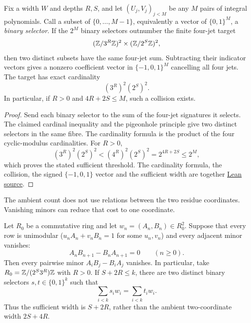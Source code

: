 \documentclass[11pt]{article}
\begin{document}
\begin{theorem}\label{res:jetkernel}
Fix a width \(W\) and depths \(R,S\), and let \((U_j,V_j)_{j<M}\) be any \(M\)
pairs of integral polynomials.  Call a subset of \(\{0,\dots,M-1\}\), equivalently
a vector of \(\{0,1\}^M\), a \emph{binary selector}.  If the
\(2^M\) binary selectors outnumber the finite four-jet target
\[
 (\mathbb{Z}/3^R\mathbb{Z})^2\times(\mathbb{Z}/2^S\mathbb{Z})^2,
\]
then two distinct subsets have the same four-jet sum.  Subtracting their
indicator vectors gives a nonzero coefficient vector in
\(\{-1,0,1\}^M\) cancelling all four jets.  The target has exact cardinality
\[
 (3^R)^2(2^S)^2.
\]
In particular, if \(R>0\) and \(4R+2S\le M\), such a collision exists.
\end{theorem}

\begin{proof}
Send each binary selector to the sum of the four-jet signatures it selects.
The claimed cardinal inequality and the pigeonhole principle give two
distinct selectors in the same fibre.  The cardinality formula is the product
of the four cyclic-modulus cardinalities.  For \(R>0\),
\[
 (3^R)^2(2^S)^2<(4^R)^2(2^S)^2=2^{4R+2S}\le2^M,
\]
which proves the stated sufficient threshold.
The cardinality formula, the collision, the signed \(\{-1,0,1\}\) vector and
the sufficient width are together \href{https://github.com/wcook04/plectis-erdos/blob/f36a98bf3d3e6f65f1074e3b800e3293d5b8a51a/ErdosProblems/Erdos1049/PaperFiniteAssembliesR7.lean#L248}{Lean source}.
\end{proof}

The ambient count does not use relations between the two residue
coordinates.  Vanishing minors can reduce that cost to one coordinate.

\begin{theorem}
\label{res:plucker-collapse}
Let $R_0$ be a commutative ring and let $w_n=(A_n,B_n)\in R_0^2$.  Suppose
that every row is unimodular ($u_n A_n+v_n B_n=1$ for some $u_n,v_n$) and every adjacent minor vanishes:
\[
 A_nB_{n+1}-B_nA_{n+1}=0\qquad(n\ge0).
\]
Then every pairwise minor $A_iB_j-B_iA_j$ vanishes.  In particular, take
$R_0=\mathbb{Z}/(2^S3^R)\mathbb{Z}$ with $R>0$.  If $S+2R\le k$, there are two distinct
binary selectors $s,t\in\{0,1\}^{k}$ such that
\[
 \sum_{i<k}s_iw_i=\sum_{i<k}t_iw_i.
\]
Thus the sufficient width is $S+2R$, rather than the ambient two-coordinate
width $2S+4R$.
\end{theorem}
\end{document}
